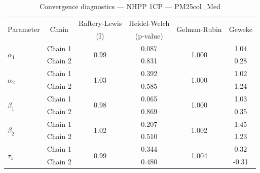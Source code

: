 \begin{table}[H]
\centering
\caption{Convergence diagnostics — NHPP 1CP — PM25col_Med}
\begin{tabular}{lccccc}
\toprule
\multirow{2}{*}{Parameter} & \multirow{2}{*}{Chain} & Raftery-Lewis & Heidel-Welch & \multirow{2}{*}{Gelman-Rubin} & \multirow{2}{*}{Geweke} \\
 & & (I) & (p-value) & & (z) \\
\midrule
\multirow{2}{*}{$\alpha_1$} & Chain 1 & \multirow{2}{*}{0.99} & 0.087 & \multirow{2}{*}{1.000} & 1.04 \\
 & Chain 2 & & 0.831 & & 0.28 \\
\multirow{2}{*}{$\alpha_2$} & Chain 1 & \multirow{2}{*}{1.03} & 0.392 & \multirow{2}{*}{1.000} & 1.02 \\
 & Chain 2 & & 0.585 & & 1.24 \\
\midrule
\multirow{2}{*}{$\beta_1$} & Chain 1 & \multirow{2}{*}{0.98} & 0.065 & \multirow{2}{*}{1.000} & 1.03 \\
 & Chain 2 & & 0.869 & & 0.35 \\
\multirow{2}{*}{$\beta_2$} & Chain 1 & \multirow{2}{*}{1.02} & 0.207 & \multirow{2}{*}{1.002} & 1.45 \\
 & Chain 2 & & 0.510 & & 1.23 \\
\midrule
\multirow{2}{*}{$\tau_1$} & Chain 1 & \multirow{2}{*}{0.99} & 0.344 & \multirow{2}{*}{1.004} & 0.32 \\
 & Chain 2 & & 0.480 & & -0.31 \\
\bottomrule
\end{tabular}
\end{table}

